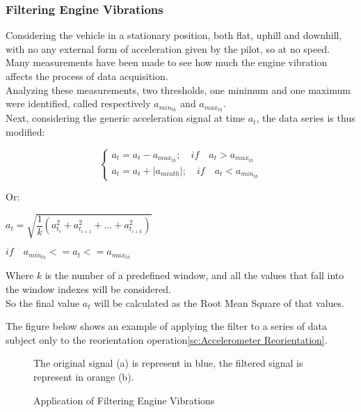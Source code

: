 \documentclass[tesi]{subfiles}
\begin{document}
\subsubsection{Filtering Engine Vibrations} \label{sssc:Remove Engine Vibrations Filter}
Considering the vehicle in a stationary position, both flat, uphill and downhill, with no any external form of acceleration given by the pilot, so at no speed. Many measurements have been made to see how much the engine vibration affects the process of data acquisition.\\
Analyzing these measurements, two thresholds, one minimum and one maximum were identified, called respectively \textbf{$a_{min_{th}}$} and \textbf{$a_{max_{th}}$}.\\
Next, considering the generic acceleration signal at time $a_{t}$, the data series is thus modified:


\begin{center}
\[
    \left\{
                \begin{array}{ll}
                  a_{t} = a_{t} - a_{max_{th}}; \quad 	if \quad a_{t} > a_{max_{th}}\\
              	  a_{t} = a_{t} + |a_{min{th}}|; \quad  if \quad a_{t} < a_{min_{th}}
                \end{array}
              \right.
\]
\end{center}
\clearpage
\noindent Or:

\begin{center}
$a_{t} = \sqrt{\dfrac{1}{k} (a_{t_{i}}^{2} + a_{t_{i+1}}^{2} + ... + a_{t_{i+k}}^{2} )} $\\
\end{center}
\begin{center}
$if\quad  a_{min_{th}} <= a_{t} <= a_{max_{th}} $


Where $k$ is the number of a predefined window, and all the values that fall into the window indexes will be considered.\\ 
\noindent So the final value $a_{t}$ will be calculated as the Root Mean Square of that values.
\end{center}

\noindent The figure below shows an example of applying the filter to a series of data subject only to the reorientation operation\ref{sc:Accelerometer Reorientation}.

\begin{figure}[H]	


\centering
{}

The original signal (a) is represent in blue, the filtered signal is represent in orange (b).
 \caption{Application of Filtering Engine Vibrations}
  \label{fig:Application of Engine Vibrations Filter.}
\end{figure}
\end{document}
